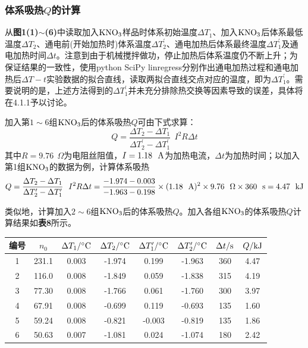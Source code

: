 \documentclass[12pt]{article}
\begin{document}
\subsubsection{体系吸热$Q$的计算}
从\textbf{图1(1)$\sim$(6)}中读取加入$\rm KNO_{3}$样品时体系初始温度$\Delta T_{1}$、加入$\rm KNO_{3}$后体系最低温度$\Delta T_{2}$、通电前(开始加热时)体系温度$\Delta T^{\prime}_{2}$、通电加热后体系最终温度$\Delta T^{\prime}_{1}$及通电加热时间$\Delta t$。注意到由于机械搅拌做功，停止加热后体系温度仍不断上升；为保证结果的一致性，使用python SciPy linregress分别作出通电加热过程和通电加热后$\Delta T-t$实验数据的拟合直线，读取两拟合直线交点对应的温度，即为$\Delta T^{\prime}_{1}$。需要说明的是，上述方法得到的$\Delta T^{\prime}_{1}$并未充分排除热交换等因素导致的误差，具体将在4.1.1予以讨论。\par 
加入第$1\sim 6$组$\rm KNO_{3}$后的体系吸热$Q$可由下式求算：
$$
Q=\frac{\Delta T_{2}-\Delta T_{1}}{\Delta T^{\prime}_{2}-\Delta T^{\prime}_{1}} \ \ I^{2}R \Delta t
$$
其中$R=9.76\ \ \Omega$为电阻丝阻值，$I=1.18\ \ {\rm A}$为加热电流，$\Delta t$为加热时间；以加入第1组$\rm KNO_{3}$的数据为例，计算体系吸热
$$
Q=\frac{\Delta T_{2}-\Delta T_{1}}{\Delta T^{\prime}_{2}-\Delta T^{\prime}_{1}} \ \ I^{2}R \Delta t=\frac{-1.974-0.003}{-1.963-0.198}\times (1.18\ \ {\rm A})^{2}\times 9.76\ \ \Omega\times 360\ \ {\rm s}=4.47\ \ {\rm kJ}
$$
\par 
类似地，计算加入$2\sim 6$组$\rm KNO_{3}$后的体系吸热$Q$。加入各组$\rm KNO_{3}$的体系吸热$Q$计算结果如\textbf{表8}所示。
\begin{table}[h]
	\centering
	\begin{tabular}{cccccccc}
		\toprule
		编号 & $n_{0}$ &  $\Delta T_{1}/{\rm ^{\circ}C}$ & $\Delta T_{2}/{\rm ^{\circ}C}$ & $\Delta T^{\prime}_{1}/{\rm ^{\circ}C}$ & $\Delta T^{\prime}_{2}/{\rm ^{\circ}C}$ & $\Delta t/{\rm s}$ & $ Q/{\rm kJ}$ \\
		\midrule
		1 & 231.1 & 0.003 & -1.974 & 0.199  & -1.963 & 360 & 4.47 \\
		2 & 116.0 & 0.008 & -1.849 & 0.059  & -1.838 & 315 & 4.19 \\
		3 & 77.30 & 0.008 & -1.766 & 0.061  & -1.760 & 300 & 3.97 \\
		4 & 67.91 & 0.008 & -0.699 & 0.119  & -0.693 & 135 & 1.60 \\
		5 & 59.24 & 0.008 & -0.821 & -0.003 & -0.819 & 135 & 1.86 \\
		6 & 50.63 & 0.007 & -1.081 & 0.024  & -1.074 & 180 & 2.42 \\
		\bottomrule
	\end{tabular}
\end{table}
\par
\end{document}

